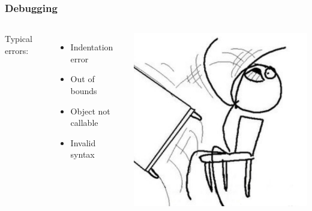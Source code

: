 \begin{frame}[fragile]

    \frametitle{Debugging}


    \begin{columns}[t]


            Typical errors:

            \begin{itemize}
                \item Indentation error
                \item Out of bounds
                \item Object not callable
                \item Invalid syntax
            \end{itemize}


        
            \includegraphics[width=0.8\linewidth]{images/flip.jpg}

    \end{columns}


\end{frame}



